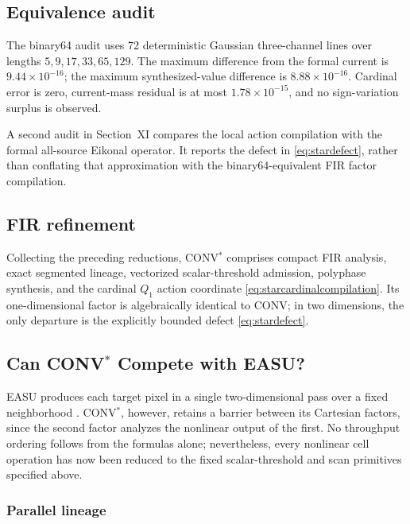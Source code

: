 \documentclass[journal]{IEEEtran}
\begin{document}
\subsection{Equivalence audit}

The binary64 audit uses 72 deterministic Gaussian three-channel lines over
lengths \(5,9,17,33,65,129\). The maximum difference from the formal current
is \(9.44\times10^{-16}\); the maximum synthesized-value difference is
\(8.88\times10^{-16}\). Cardinal error is zero, current-mass residual is at
most \(1.78\times10^{-15}\), and no sign-variation surplus is observed.

A second audit in Section~XI compares the local action compilation with the
formal all-source Eikonal operator. It reports the defect in
\eqref{eq:stardefect}, rather than conflating that approximation with the
binary64-equivalent FIR factor compilation.

\subsection{FIR refinement}

Collecting the preceding reductions, CONV$^{*}$ comprises compact FIR
analysis, exact segmented lineage, vectorized scalar-threshold admission,
polyphase synthesis, and the cardinal \(Q_1\) action coordinate
\eqref{eq:starcardinalcompilation}. Its one-dimensional factor is
algebraically identical to CONV; in two dimensions, the only departure is the
explicitly bounded defect \eqref{eq:stardefect}.

\subsection{Can CONV\texorpdfstring{$^{*}$}{*} Compete with EASU?}

EASU produces each target pixel in a single two-dimensional pass over a fixed
neighborhood \cite{lottes2021}. CONV$^{*}$, however, retains a barrier between
its Cartesian factors, since the second factor analyzes the nonlinear output
of the first. No throughput ordering follows from the formulas alone;
nevertheless, every nonlinear cell operation has now been reduced to the
fixed scalar-threshold and scan primitives specified above.

\subsubsection{Parallel lineage}
\end{document}
